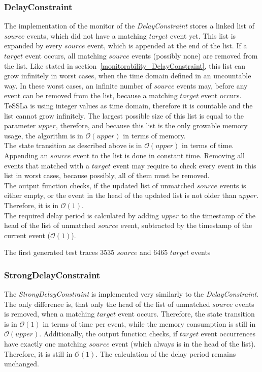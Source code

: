 \subsubsection{DelayConstraint}
	The implementation of the monitor of the \emph{DelayConstraint} stores a linked list of $source$ events, which did not have a matching $target$ event yet. This list is expanded by every $source$ event, which is appended at the end of the list. If a $target$ event occurs, all matching $source$ events (possibly none) are removed from the list. Like stated in section~\ref{monitorability_DelayConstraint}, this list can grow infinitely in worst cases, when the time domain defined in an uncountable way. In these worst cases, an infinite number of $source$ events may, before any event can be removed from the list, because a matching $target$ event occurs.\\
	TeSSLa is using integer values as time domain, therefore it is countable and the list cannot grow infinitely. The largest possible size of this list is equal to the parameter $upper$, therefore, and because this list is the only growable memory usage, the algorithm is in $\mathcal{O}(upper)$ in terms of memory.\\
	The state transition as described above is in  $\mathcal{O}(upper)$ in terms of time. Appending an $source$ event to the list is done in constant time. Removing all events that matched with a $target$ event may require to check every event in this list in worst cases, because possibly, all of them must be removed.\\
	The output function checks, if the updated list of unmatched $source$ events is either empty, or the event in the head of the updated list is not older than $upper$. Therefore, it is in $\mathcal{O}(1)$.\\
	The required delay period is calculated by adding $upper$ to the timestamp of the head of the list of unmatched $source$ event, subtracted by the timestamp of the current event ($\mathcal{O}(1)$).
	
	The first generated test traces 3535 $source$ and 6465 $target$ events
	
\subsubsection{StrongDelayConstraint}
	The \emph{StrongDelayConstraint} is implemented very similarly to the \emph{DelayConstraint}. The only difference is, that only the head of the list of unmatched $source$ events is removed, when a matching $target$ event occurs. Therefore, the state transition is in $\mathcal{O}(1)$ in terms of time per event, while the memory consumption is still in  $\mathcal{O}(upper)$. Additionally, the output function checks, if $target$ event occurrences have exactly one matching $source$ event (which always is in the head of the list). Therefore, it is still in $\mathcal{O}(1)$. The calculation of the delay period remains unchanged.
	
